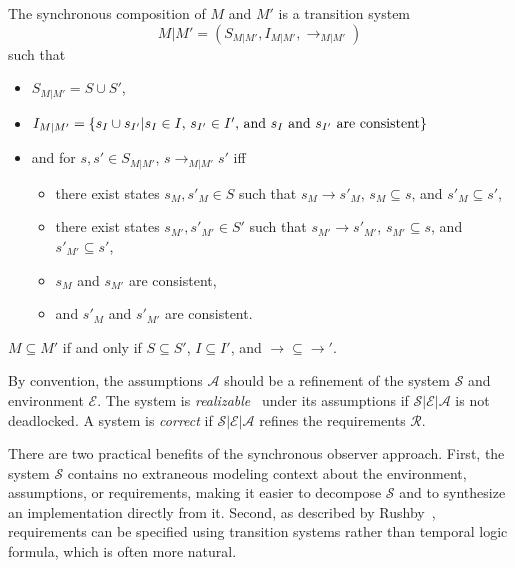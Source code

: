 \documentclass{llncs/llncs}
\begin{document}
\begin{definition}
The synchronous composition of $M$ and $M'$ is a transition system
$$M | M' = (S_{M | M'}, I_{M | M'}, \rightarrow_{M | M'})$$
\noindent
such that
\begin{itemize}
\item $S_{M | M'} = S \cup S'$,
\item $I_{M | M'} = \{ s_I \cup s_{I'} | s_I \in I\textnormal{, }s_{I'} \in I'\textnormal{, and } s_I \textnormal{ and } s_{I'}\textnormal{ are consistent}\}$
\item and for $s, s' \in S_{M | M'}$, $s \rightarrow_{M | M'} s'$ iff
  \begin{itemize}
  \item there exist states $s_M, s'_M \in S$ such that $s_M \rightarrow s'_M$, $s_M \subseteq s$, and $s'_M \subseteq s'$,
  \item there exist states $s_{M'}, s'_{M'} \in S'$ such that $s_{M'} \rightarrow s'_{M'}$, $s_{M'} \subseteq s$, and $s'_{M'} \subseteq s'$,
  \item $s_M$ and $s_{M'}$ are consistent,
  \item and $s'_M$ and $s'_{M'}$ are consistent.
  \end{itemize}
\end{itemize}
\end{definition}

\begin{definition}
$M \subseteq M'$ if and only if $S \subseteq S'$, $I \subseteq I'$, and $\rightarrow \subseteq \rightarrow'$.
\end{definition}

By convention, the assumptions $\mathcal{A}$ should be a refinement of the system $\mathcal{S}$ and environment $\mathcal{E}$. The system is \emph{realizable}~\cite{} under its assumptions if $\mathcal{S} | \mathcal{E} | \mathcal{A}$ is not deadlocked. A system is \emph{correct} if $\mathcal{S} | \mathcal{E} | \mathcal{A}$ refines the requirements $\mathcal{R}$.

There are two practical benefits of the synchronous observer approach. First, the system $\mathcal{S}$ contains no extraneous modeling context about the environment, assumptions, or requirements, making it easier to decompose $\mathcal{S}$ and to synthesize an implementation directly from it. Second, as described by Rushby~\cite{}, requirements can be specified using transition systems rather than temporal logic formula, which is often more natural.
\end{document}
